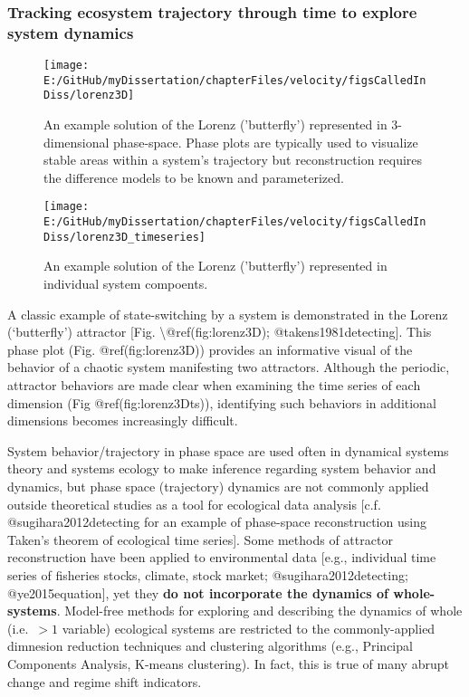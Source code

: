 \documentclass[]{article}
\begin{document}
\hypertarget{tracking-ecosystem-trajectory-through-time-to-explore-system-dynamics}{%
\subsubsection{Tracking ecosystem trajectory through time to explore
system
dynamics}\label{tracking-ecosystem-trajectory-through-time-to-explore-system-dynamics}}

\begin{figure}

{\centering \texttt{[image: E:/GitHub/myDissertation/chapterFiles/velocity/figsCalledInDiss/lorenz3D]} 

}

\caption{An example solution of the Lorenz ('butterfly') represented in 3-dimensional phase-space. Phase plots are typically used to visualize stable areas within a system's trajectory but reconstruction requires the difference models to be known and parameterized.}\label{fig:lorenz3D}
\end{figure}
\begin{figure}

{\centering \texttt{[image: E:/GitHub/myDissertation/chapterFiles/velocity/figsCalledInDiss/lorenz3D\_timeseries]} 

}

\caption{An example solution of the Lorenz ('butterfly') represented in individual system compoents.}\label{fig:lorenz3Dts}
\end{figure}

A classic example of state-switching by a system is demonstrated in the
Lorenz (`butterfly') attractor {[}Fig.
\textbackslash{}@ref(fig:lorenz3D); @takens1981detecting{]}. This phase
plot (Fig. @ref(fig:lorenz3D)) provides an informative visual of the
behavior of a chaotic system manifesting two attractors. Although the
periodic, attractor behaviors are made clear when examining the time
series of each dimension (Fig @ref(fig:lorenz3Dts)), identifying such
behaviors in additional dimensions becomes increasingly difficult.

System behavior/trajectory in phase space are used often in dynamical
systems theory and systems ecology to make inference regarding system
behavior and dynamics, but phase space (trajectory) dynamics are not
commonly applied outside theoretical studies as a tool for ecological
data analysis {[}c.f. @sugihara2012detecting for an example of
phase-space reconstruction using Taken's theorem of ecological time
series{]}. Some methods of attractor reconstruction have been applied to
environmental data {[}e.g., individual time series of fisheries stocks,
climate, stock market; @sugihara2012detecting; @ye2015equation{]}, yet
they \textbf{do not incorporate the dynamics of whole-systems}.
Model-free methods for exploring and describing the dynamics of whole
(i.e.~\(>1\) variable) ecological systems are restricted to the
commonly-applied dimnesion reduction techniques and clustering
algorithms (e.g., Principal Components Analysis, K-means clustering). In
fact, this is true of many abrupt change and regime shift indicators.
\end{document}
